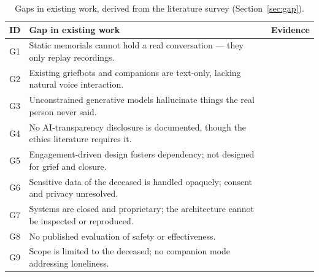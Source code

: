 \documentclass[11pt,a4paper]{report}
\begin{document}
\begin{table}[htbp]
\centering
\caption{Gaps in existing work, derived from the literature survey (Section~\ref{sec:gap}).}
\label{tab:gaps}
\small
\begin{tabularx}{\linewidth}{@{}l X l@{}}
\toprule
\textbf{ID} & \textbf{Gap in existing work} & \textbf{Evidence} \\
\midrule
G1 & Static memorials cannot hold a real conversation --- they only replay recordings. & \cite{hereafter} \\
G2 & Existing griefbots and companions are text-only, lacking natural voice interaction. & \cite{fagone2021jessica,zhou2020xiaoice} \\
G3 & Unconstrained generative models hallucinate things the real person never said. & \cite{brown2020language,ji2023survey,yov} \\
G4 & No AI-transparency disclosure is documented, though the ethics literature requires it. & \cite{hollanek2024griefbots,yov} \\
G5 & Engagement-driven design fosters dependency; not designed for grief and closure. & \cite{zhou2020xiaoice,laestadius2024human,yov} \\
G6 & Sensitive data of the deceased is handled opaquely; consent and privacy unresolved. & \cite{abramson2020patent,ohman2018ethical} \\
G7 & Systems are closed and proprietary; the architecture cannot be inspected or reproduced. & \cite{abramson2020patent,yov} \\
G8 & No published evaluation of safety or effectiveness. & \cite{fagone2021jessica,yov} \\
G9 & Scope is limited to the deceased; no companion mode addressing loneliness. & \cite{yov} \\
\bottomrule
\end{tabularx}
\end{table}
\end{document}
